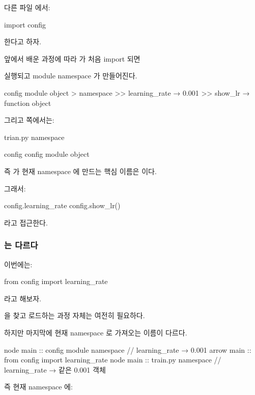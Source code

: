 다른 파일 에서:

\begin{dhkcode}
import config
\end{dhkcode}

한다고 하자.

앞에서 배운 과정에 따라 가 처음 import 되면

실행되고 module namespace 가 만들어진다.

\begin{dhkdir}
config module object
> namespace
>> learning_rate → 0.001
>> show_lr → function object
\end{dhkdir}

그리고 쪽에서는:

\begin{dhksmry}
    trian.py namespace
    
    config \ra config module object
\end{dhksmry}

즉 가 현재 namespace 에 만드는 핵심 이름은 이다.

그래서:

\begin{dhkcode}
config.learning_rate
config.show_lr()
\end{dhkcode}

라고 접근한다.

\subsubsection{는 다르다}

이번에는:

\begin{dhkcode}
from config import learning_rate
\end{dhkcode}

라고 해보자.

을 찾고 로드하는 과정 자체는 여전히 필요하다.

하지만 마지막에 현재 namespace 로 가져오는 이름이 다르다.

\begin{dhkbranch}
node main :: config module namespace // learning_rate → 0.001
arrow main :: from config import learning_rate
node main :: train.py namespace // learning_rate → 같은 0.001 객체
\end{dhkbranch}

즉 현재 namespace 에:

